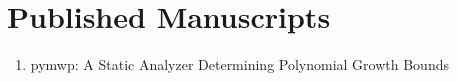 \section{Published Manuscripts}
\label{sec:published-manuscripts}

\begin{enumerate}[label=\Alph*]
\item pymwp: A Static Analyzer Determining Polynomial Growth Bounds
\end{enumerate}

\pagebreak

